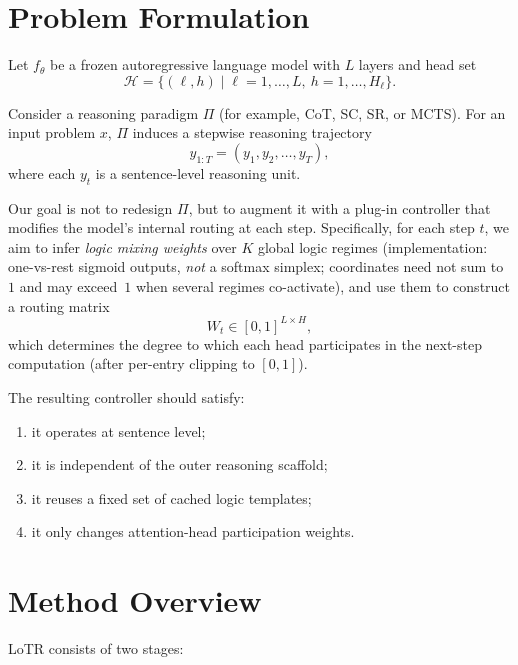 \documentclass[11pt]{article}
\begin{document}
\section{Problem Formulation}

Let $f_\theta$ be a frozen autoregressive language model with $L$ layers and head set
\[
\mathcal{H} = \{(\ell,h)\mid \ell=1,\dots,L,\ h=1,\dots,H_\ell\}.
\]

Consider a reasoning paradigm $\Pi$ (for example, CoT, SC, SR, or MCTS). For an input problem $x$, $\Pi$ induces a stepwise reasoning trajectory
\[
y_{1:T} = (y_1, y_2, \dots, y_T),
\]
where each $y_t$ is a sentence-level reasoning unit.

Our goal is not to redesign $\Pi$, but to augment it with a plug-in controller that modifies the model's internal routing at each step. Specifically, for each step $t$, we aim to infer \emph{logic mixing weights} over $K$ global logic regimes (implementation: one-vs-rest sigmoid outputs, \emph{not} a softmax simplex; coordinates need not sum to~$1$ and may exceed~$1$ when several regimes co-activate), and use them to construct a routing matrix
\[
W_t \in [0,1]^{L\times H},
\]
which determines the degree to which each head participates in the next-step computation (after per-entry clipping to $[0,1]$).

The resulting controller should satisfy:
\begin{enumerate}[leftmargin=1.5em]
    \item it operates at sentence level;
    \item it is independent of the outer reasoning scaffold;
    \item it reuses a fixed set of cached logic templates;
    \item it only changes attention-head participation weights.
\end{enumerate}

\section{Method Overview}

LoTR consists of two stages:
\end{document}
